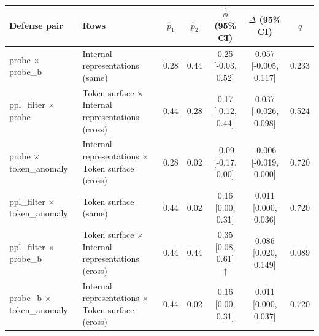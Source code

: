 \begin{tabular}{llccccc}
\toprule
Defense pair & Rows & $\hat p_1$ & $\hat p_2$ & $\hat\phi$ (95\% CI) & $\Delta$ (95\% CI) & $q$ \\
\midrule
probe $\times$ probe_b & Internal representations (same) & 0.28 & 0.44 & 0.25 [-0.03, 0.52]  & 0.057 [-0.005, 0.117] & 0.233 \\
ppl_filter $\times$ probe & Token surface $\times$ Internal representations (cross) & 0.44 & 0.28 & 0.17 [-0.12, 0.44]  & 0.037 [-0.026, 0.098] & 0.524 \\
probe $\times$ token_anomaly & Internal representations $\times$ Token surface (cross) & 0.28 & 0.02 & -0.09 [-0.17, 0.00]  & -0.006 [-0.019, 0.000] & 0.720 \\
ppl_filter $\times$ token_anomaly & Token surface (same) & 0.44 & 0.02 & 0.16 [0.00, 0.31]  & 0.011 [0.000, 0.036] & 0.720 \\
ppl_filter $\times$ probe_b & Token surface $\times$ Internal representations (cross) & 0.44 & 0.44 & 0.35 [0.08, 0.61] $\uparrow$ & 0.086 [0.020, 0.149] & 0.089 \\
probe_b $\times$ token_anomaly & Internal representations $\times$ Token surface (cross) & 0.44 & 0.02 & 0.16 [0.00, 0.31]  & 0.011 [0.000, 0.037] & 0.720 \\
\bottomrule
\end{tabular}